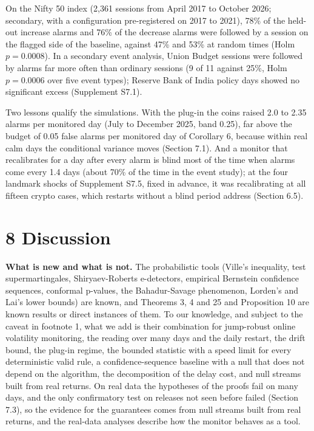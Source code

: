 \documentclass[
]{article}
\begin{document}
On the Nifty 50 index (2,361 sessions from April 2017 to October 2026;
secondary, with a configuration pre-registered on 2017 to 2021), 78\% of
the held-out increase alarms and 76\% of the decrease alarms were
followed by a session on the flagged side of the baseline, against 47\%
and 53\% at random times (Holm \(p = 0.0008\)). In a secondary event
analysis, Union Budget sessions were followed by alarms far more often
than ordinary sessions (9 of 11 against 25\%, Holm \(p = 0.0006\) over
five event types); Reserve Bank of India policy days showed no
significant excess (Supplement S7.1).

Two lessons qualify the simulations. With the plug-in the coins raised
2.0 to 2.35 alarms per monitored day (July to December 2025, band 0.25),
far above the budget of 0.05 false alarms per monitored day of Corollary
6, because within real calm days the conditional variance moves (Section
7.1). And a monitor that recalibrates for a day after every alarm is
blind most of the time when alarms come every 1.4 days (about 70\% of
the time in the event study); at the four landmark shocks of Supplement
S7.5, fixed in advance, it was recalibrating at all fifteen crypto
cases, which restarts without a blind period address (Section 6.5).

\hypertarget{discussion}{%
\section{8 Discussion}\label{discussion}}

\textbf{What is new and what is not.} The probabilistic tools (Ville's
inequality, test supermartingales, Shiryaev-Roberts e-detectors,
empirical Bernstein confidence sequences, conformal p-values, the
Bahadur-Savage phenomenon, Lorden's and Lai's lower bounds) are known,
and Theorems 3, 4 and 25 and Proposition 10 are known results or direct
instances of them. To our knowledge, and subject to the caveat in
footnote 1, what we add is their combination for jump-robust online
volatility monitoring, the reading over many days and the daily restart,
the drift bound, the plug-in regime, the bounded statistic with a speed
limit for every deterministic valid rule, a confidence-sequence baseline
with a null that does not depend on the algorithm, the decomposition of
the delay cost, and null streams built from real returns. On real data
the hypotheses of the proofs fail on many days, and the only
confirmatory test on releases not seen before failed (Section 7.3), so
the evidence for the guarantees comes from null streams built from real
returns, and the real-data analyses describe how the monitor behaves as
a tool.
\end{document}
